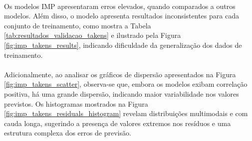 \paragraph{} Os modelos \ac{IMP} apresentaram erros elevados, quando comparados a outros modelos. Além disso, o modelo apresenta resultados inconsistentes para cada conjunto de treinamento, como mostra a Tabela \ref{tab:resultados_validacao_takens} e ilustrado pela Figura \ref{fig:imp_takens_results}, indicando dificuldade da generalização dos dados de treinamento.
\paragraph{} Adicionalmente, ao analisar os gráficos de dispersão apresentados na Figura \ref{fig:imp_takens_scatter}, observa-se que, embora os modelos exibam correlação positiva, há uma grande dispersão, indicando maior variabilidade nos valores previstos. Os histogramas mostrados na Figura \ref{fig:imp_takens_residuals_histogram} revelam distribuições multimodais e com cauda longa, sugerindo a presença de valores extremos nos resíduos e uma estrutura complexa dos erros de previsão.

